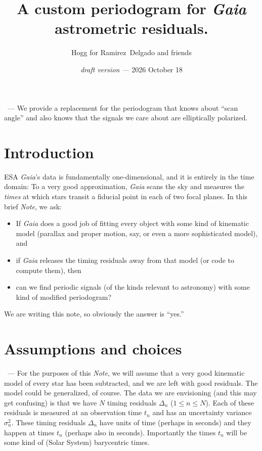 \documentclass{article}
\title{\bfseries A custom periodogram for \textsl{Gaia} astrometric residuals.}
\author{Hogg for Ramirez~Delgado and friends}
\date{\textit{draft version ---} 2026 October 18}
\renewcommand{\paragraph}[1]{\medskip\par\noindent{\textbf{#1}}~---}
\newcommand{\documentname}{\textsl{Note}}
\begin{document}
\maketitle

\paragraph{Abstract}
We provide a replacement for the periodogram that knows about ``scan angle'' and also knows that the signals we care about are elliptically polarized.

\section{Introduction}\label{sec:intro}
ESA \textsl{Gaia}'s data is fundamentally one-dimensional, and it is entirely in the time domain:
To a very good approximation, \textsl{Gaia} scans the sky and measures the \emph{times} at which stars transit a fiducial point in each of two focal planes.
In this brief \documentname, we ask:
\begin{itemize}
    \item If \textsl{Gaia} does a good job of fitting every object with some kind of kinematic model (parallax and proper motion, say, or even a more sophisticated model), and
    \item if \textsl{Gaia} releases the timing residuals away from that model (or code to compute them), then
    \item can we find periodic signals (of the kinds relevant to astronomy) with some kind of modified periodogram?
\end{itemize}
We are writing this note, so obviously the answer is ``yes.''

\section{Assumptions and choices}\label{sec:assumptions}
\paragraph{Residual data}
For the purposes of this \documentname, we will assume that a very good kinematic model of every star has been subtracted, and we are left with good residuals.
The model could be generalized, of course.
The data we are envisioning (and this may get confusing) is that we have $N$ timing residuals $\Delta_n$ ($1\leq n\leq N$).
Each of these residuals is measured at an observation time $t_n$ and has an uncertainty variance $\sigma^2_n$.
These timing residuals $\Delta_n$ have units of time (perhaps in seconds) and they happen at times $t_n$ (perhaps also in seconds).
Importantly the times $t_n$ will be some kind of (Solar System) barycentric times.
\end{document}
